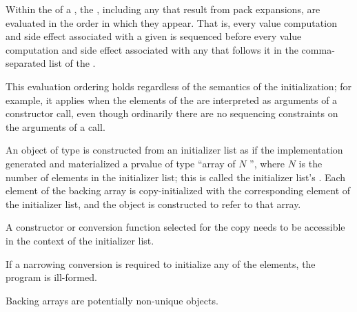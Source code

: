 \pnum
Within the  of a ,
the , including any that result from pack
expansions, are evaluated in the order in which they
appear. That is, every value computation and side effect associated with a
given  is sequenced before every value
computation and side effect associated with any 
that follows it in the comma-separated list of the .
\begin{note}
This evaluation ordering holds regardless of the semantics of the
initialization; for example, it applies when the elements of the
 are interpreted as arguments of a constructor
call, even though ordinarily there are no sequencing constraints on the
arguments of a call.
\end{note}

\pnum
An object of type  is constructed from
an initializer list as if
the implementation generated and materialized
a prvalue of type ``array of $N$ '',
where $N$ is the number of elements in the initializer list;
this is called the initializer list's .
Each element of the backing array is copy-initialized with the
corresponding element of the initializer list, and the
 object is constructed to refer to that array.
\begin{note}
A constructor or conversion function selected for the copy needs to be
accessible in the context of the initializer list.
\end{note}
If a narrowing conversion is required to initialize any of the elements,
the program is ill-formed.
\begin{note}
Backing arrays are potentially non-unique objects.
\end{note}

